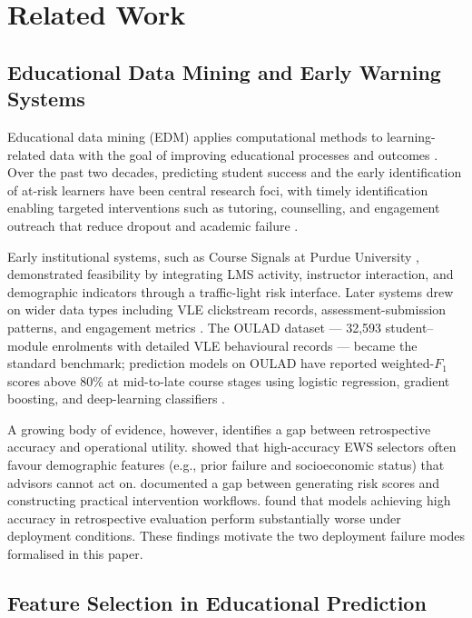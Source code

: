 \documentclass[a4paper,fleqn]{cas-sc}
\begin{document}
\section{Related Work}
\label{sec:related_work}
 
\subsection{Educational Data Mining and Early Warning Systems}
 
Educational data mining (EDM) applies computational methods to learning-related data with the goal of improving educational processes and outcomes \citep{romero2010}. Over the past two decades, predicting student success and the early identification of at-risk learners have been central research foci, with timely identification enabling targeted interventions such as tutoring, counselling, and engagement outreach that reduce dropout and academic failure \citep{arnold2012,jayaprakash2014}.
 
Early institutional systems, such as Course Signals at Purdue University \citep{arnold2012}, demonstrated feasibility by integrating LMS activity, instructor interaction, and demographic indicators through a traffic-light risk interface.
Later systems drew on wider data types including VLE clickstream records, assessment-submission patterns, and engagement metrics \citep{hlosta2017,waheed2020}. The OULAD dataset \citep{kuzilek2017} --- 32,593 student--module enrolments with detailed VLE behavioural records --- became the standard benchmark; prediction models on OULAD have reported weighted-$F_1$ scores above 80\% at mid-to-late course stages using logistic regression, gradient boosting, and deep-learning classifiers \citep{hlosta2017,waheed2020}.
 
A growing body of evidence, however, identifies a gap between retrospective accuracy and operational utility. \citet{gardner2018} showed that high-accuracy EWS selectors often favour demographic features (e.g., prior failure and socioeconomic status) that advisors cannot act on. \citet{rizvi2019} documented a gap between generating risk scores and constructing practical intervention workflows. \citet{hussain2019} found that models achieving high accuracy in retrospective evaluation perform substantially worse under deployment conditions. These findings motivate the two deployment failure modes formalised in this paper.
 
\subsection{Feature Selection in Educational Prediction}
 
\end{document}
